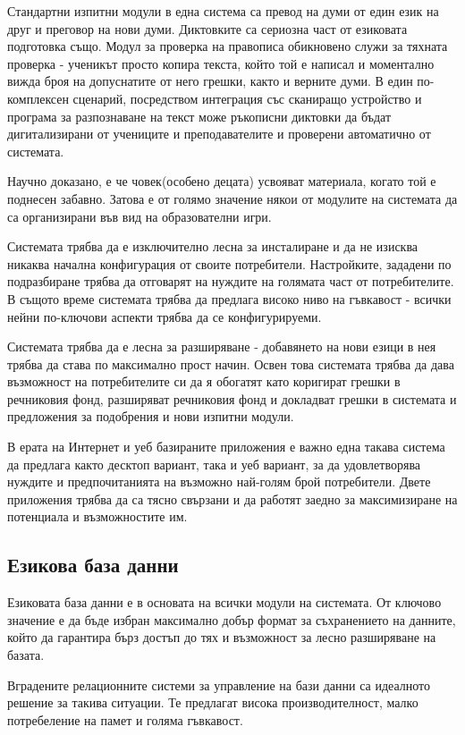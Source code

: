 Стандартни изпитни модули в една система са превод на думи от един
език на друг и преговор на нови думи. Диктовките са сериозна част от
езиковата подготовка също. Модул за проверка на правописа обикновено служи
за тяхната проверка - ученикът просто копира текста, който той е
написал и моментално вижда броя на допуснатите от него грешки, както и
верните думи. В един по-комплексен сценарий, посредством интеграция със
сканиращо устройство и програма за разпознаване на текст може
ръкописни диктовки да бъдат дигитализирани от учениците и
преподавателите и проверени автоматично от системата. 

Научно доказано, е че човек(особено децата) усвояват материала, когато
той е поднесен забавно. Затова е от голямо значение някои от модулите
на системата да са организирани във вид на образователни игри.

Системата трябва да е изключително лесна за инсталиране и да не
изисква никаква начална конфигурация от своите
потребители. Настройките, зададени по подразбиране трябва да отговарят
на нуждите на голямата част от потребителите. В същото време системата
трябва да предлага високо ниво на гъвкавост - всички нейни по-ключови
аспекти трябва да се конфигурируеми. 

Системата трябва да е лесна за разширяване - добавянето на нови езици
в нея трябва да става по максимално прост начин. Освен това системата
трябва да дава възможност на потребителите си да я обогатят като
коригират грешки в речниковия фонд, разширяват речниковия фонд и
докладват грешки в системата и предложения за подобрения и нови
изпитни модули.

В ерата на Интернет и уеб базираните приложения е важно една такава
система да предлага както десктоп вариант, така и уеб вариант, за да
удовлетворява нуждите и предпочитанията на възможно най-голям брой
потребители. Двете приложения трябва да са тясно свързани и да работят
заедно за максимизиране на потенциала и възможностите им. 
\subsection{Езикова база данни}
Езиковата база данни е в основата на всички модули на системата. От
ключово значение е да бъде избран максимално добър формат за
съхранението на данните, който да гарантира бърз достъп до тях и
възможност за лесно разширяване на базата. 

Вградените релационните системи за управление на бази данни са
идеалното решение за такива ситуации. Те предлагат висока
производителност, малко потребеление на памет и голяма
гъвкавост. 

